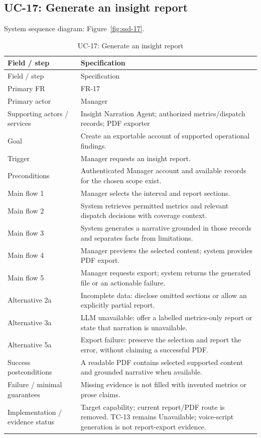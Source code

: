 \subsection*{UC-17: Generate an insight report}
\label{uc:17}
System sequence diagram: Figure~\ref{fig:ssd-17}.

\begin{longtable}{P{0.23\textwidth}P{0.67\textwidth}}
\caption{UC-17: Generate an insight report}\\
\toprule
Field / step & Specification\\
\midrule
\endfirsthead
\toprule
Field / step & Specification\\
\midrule
\endhead
Primary FR & FR-17\\
Primary actor & Manager\\
Supporting actors / services & Insight Narration Agent; authorized metrics/dispatch records; PDF exporter\\
Goal & Create an exportable account of supported operational findings.\\
Trigger & Manager requests an insight report.\\
Preconditions & Authenticated Manager account and available records for the chosen scope exist.\\
Main flow 1 & Manager selects the interval and report sections.\\
Main flow 2 & System retrieves permitted metrics and relevant dispatch decisions with coverage context.\\
Main flow 3 & System generates a narrative grounded in those records and separates facts from limitations.\\
Main flow 4 & Manager previews the selected content; system provides PDF export.\\
Main flow 5 & Manager requests export; system returns the generated file or an actionable failure.\\
Alternative 2a & Incomplete data: disclose omitted sections or allow an explicitly partial report.\\
Alternative 3a & LLM unavailable: offer a labelled metrics-only report or state that narration is unavailable.\\
Alternative 5a & Export failure: preserve the selection and report the error, without claiming a successful PDF.\\
Success postconditions & A readable PDF contains selected supported content and grounded narrative when available.\\
Failure / minimal guarantees & Missing evidence is not filled with invented metrics or prose claims.\\
Implementation / evidence status & Target capability; current report/PDF route is removed. TC-13 remains Unavailable; voice-script generation is not report-export evidence.\\
\bottomrule
\end{longtable}


